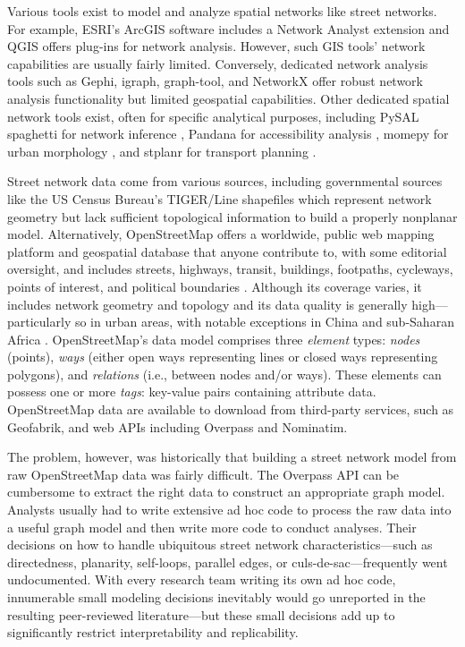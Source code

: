 \documentclass[12pt,letterpaper]{article} %
\begin{document}
Various tools exist to model and analyze spatial networks like street networks. For example, ESRI's ArcGIS software includes a Network Analyst extension and QGIS offers plug-ins for network analysis. However, such GIS tools' network capabilities are usually fairly limited. Conversely, dedicated network analysis tools such as Gephi, igraph, graph-tool, and NetworkX offer robust network analysis functionality but limited geospatial capabilities. Other dedicated spatial network tools exist, often for specific analytical purposes, including PySAL spaghetti for network inference \citep{gaboardi_spaghetti_2021,rey_pysal_2022}, Pandana for accessibility analysis \citep{foti_behavioral_2014}, momepy for urban morphology \citep{fleischmann_momepy_2019}, and stplanr for transport planning \citep{lovelace_stplanr_2019}.

Street network data come from various sources, including governmental sources like the US Census Bureau's TIGER/Line shapefiles which represent network geometry but lack sufficient topological information to build a properly nonplanar model. Alternatively, OpenStreetMap offers a worldwide, public web mapping platform and geospatial database that anyone contribute to, with some editorial oversight, and includes streets, highways, transit, buildings, footpaths, cycleways, points of interest, and political boundaries \citep{jokar_arsanjani_openstreetmap_2015}. Although its coverage varies, it includes network geometry and topology and its data quality is generally high---particularly so in urban areas, with notable exceptions in China and sub-Saharan Africa \citep{barron_comprehensive_2014,barrington-leigh_worlds_2017}. OpenStreetMap's data model comprises three \textit{element} types: \textit{nodes} (points), \textit{ways} (either open ways representing lines or closed ways representing polygons), and \textit{relations} (i.e., between nodes and/or ways). These elements can possess one or more \textit{tags}: key-value pairs containing attribute data. OpenStreetMap data are available to download from third-party services, such as Geofabrik, and web APIs including Overpass and Nominatim.

The problem, however, was historically that building a street network model from raw OpenStreetMap data was fairly difficult. The Overpass API can be cumbersome to extract the right data to construct an appropriate graph model. Analysts usually had to write extensive ad hoc code to process the raw data into a useful graph model and then write more code to conduct analyses. Their decisions on how to handle ubiquitous street network characteristics---such as directedness, planarity, self-loops, parallel edges, or culs-de-sac---frequently went undocumented. With every research team writing its own ad hoc code, innumerable small modeling decisions inevitably would go unreported in the resulting peer-reviewed literature---but these small decisions add up to significantly restrict interpretability and replicability.
\end{document}
